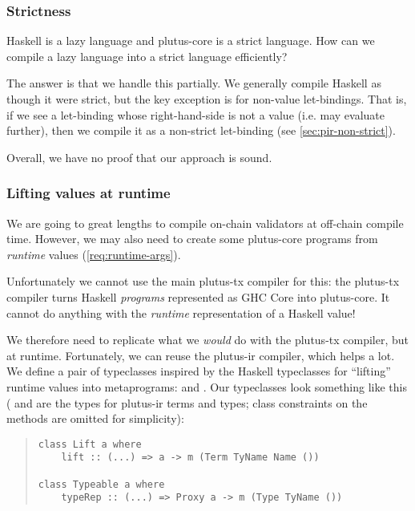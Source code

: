 \subsubsection{Strictness}
\label{sec:plutus-tx-strictness}

Haskell is a lazy language and \gls{plutus-core} is a strict language.
How can we compile a lazy language into a strict language efficiently?

The answer is that we handle this partially.
We generally compile Haskell as though it were strict, but the key exception is for non-value let-bindings.
That is, if we see a let-binding whose right-hand-side is not a value (i.e. may evaluate further), then we compile it as a non-strict let-binding (see \cref{sec:pir-non-strict}).

Overall, we have no proof that our approach is sound.


\subsubsection{Lifting values at runtime}
\label{sec:plutus-tx-lifting}

We are going to great lengths to compile \gls{on-chain} \glspl{validator} at \gls{off-chain} compile time.
However, we may also need to create some \gls{plutus-core} programs from \emph{runtime} values (\cref{req:runtime-args}).

Unfortunately we cannot use the main \gls{plutus-tx} compiler for this: the \gls{plutus-tx} compiler turns Haskell \emph{programs} represented as GHC Core into \gls{plutus-core}.
It cannot do anything with the \emph{runtime} representation of a Haskell value!

We therefore need to replicate what we \emph{would} do with the \gls{plutus-tx} compiler, but at runtime.
Fortunately, we can reuse the \gls{plutus-ir} compiler, which helps a lot.
We define a pair of typeclasses inspired by the Haskell typeclasses for ``lifting'' runtime values into metaprograms:  and .
Our typeclasses look something like this ( and  are the types for \gls{plutus-ir} terms and types; class constraints on the methods are omitted for simplicity):

\begin{quote}
\begin{verbatim}
class Lift a where
    lift :: (...) => a -> m (Term TyName Name ())

class Typeable a where
    typeRep :: (...) => Proxy a -> m (Type TyName ())
\end{verbatim}
\end{quote}

